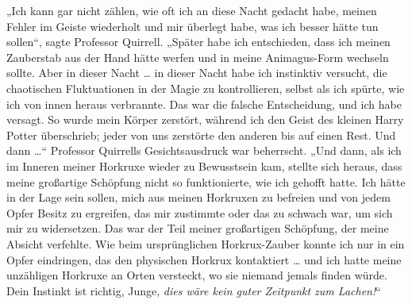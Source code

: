 „Ich kann gar nicht zählen, wie oft ich an diese Nacht gedacht habe, meinen Fehler im Geiste wiederholt und mir überlegt habe, was ich besser hätte tun sollen“, sagte Professor Quirrell.
„Später habe ich entschieden, dass ich meinen Zauberstab aus der Hand hätte werfen und in meine Animagus-Form wechseln sollte. Aber in dieser Nacht … in dieser Nacht habe ich instinktiv versucht, die chaotischen Fluktuationen in der Magie zu kontrollieren, selbst als ich spürte, wie ich von innen heraus verbrannte. Das war die falsche Entscheidung, und ich habe versagt. So wurde mein Körper zerstört, während ich den Geist des kleinen Harry Potter überschrieb; jeder von uns zerstörte den anderen bis auf einen Rest. Und dann …“
Professor Quirrells Gesichtsausdruck war beherrscht.
„Und dann, als ich im Inneren meiner Horkruxe wieder zu Bewusstsein kam, stellte sich heraus, dass meine großartige Schöpfung nicht so funktionierte, wie ich gehofft hatte. Ich hätte in der Lage sein sollen, mich aus meinen Horkruxen zu befreien und von jedem Opfer Besitz zu ergreifen, das mir zustimmte oder das zu schwach war, um sich mir zu widersetzen. Das war der Teil meiner großartigen Schöpfung, der meine Absicht verfehlte. Wie beim ursprünglichen Horkrux-Zauber konnte ich nur in ein Opfer eindringen, das den physischen Horkrux kontaktiert … und ich hatte meine unzähligen Horkruxe an Orten versteckt, wo sie niemand jemals finden würde. Dein Instinkt ist richtig, Junge, \emph{dies wäre kein guter Zeitpunkt zum Lachen!}“

